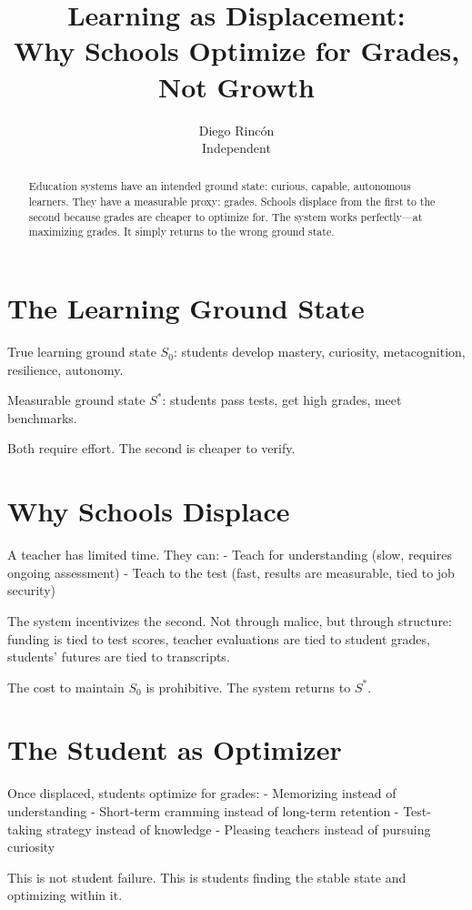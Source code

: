 \documentclass[12pt]{article}
\title{Learning as Displacement:\\
Why Schools Optimize for Grades, Not Growth}
\author{Diego Rincón\\
\small Independent}
\date{}
\begin{document}
\maketitle

\begin{abstract}
Education systems have an intended ground state: curious, capable, autonomous learners. They have a measurable proxy: grades. Schools displace from the first to the second because grades are cheaper to optimize for. The system works perfectly—at maximizing grades. It simply returns to the wrong ground state.
\end{abstract}

\section{The Learning Ground State}

True learning ground state $S_0$: students develop mastery, curiosity, metacognition, resilience, autonomy.

Measurable ground state $S^*$: students pass tests, get high grades, meet benchmarks.

Both require effort. The second is cheaper to verify.

\section{Why Schools Displace}

A teacher has limited time. They can:
- Teach for understanding (slow, requires ongoing assessment)
- Teach to the test (fast, results are measurable, tied to job security)

The system incentivizes the second. Not through malice, but through structure: funding is tied to test scores, teacher evaluations are tied to student grades, students' futures are tied to transcripts.

The cost to maintain $S_0$ is prohibitive. The system returns to $S^*$.

\section{The Student as Optimizer}

Once displaced, students optimize for grades:
- Memorizing instead of understanding
- Short-term cramming instead of long-term retention
- Test-taking strategy instead of knowledge
- Pleasing teachers instead of pursuing curiosity

This is not student failure. This is students finding the stable state and optimizing within it.
\end{document}

